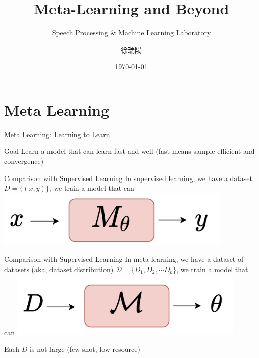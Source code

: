 \documentclass{beamer}
\title{Meta-Learning and Beyond}
\subtitle{\textcolor[rgb]{0.00,0.50,1.00}{{Speech Processing \& Machine Learning Laboratory}}}
\author{徐瑞陽}
\date{\today}
\begin{document}
\begin{frame}
\maketitle
\end{frame}

\section{Meta Learning}

\begin{frame}[t]{Meta Learning: Learning to Learn}
  \begin{block}{Goal}
    Learn a model that can learn fast and well (fast means sample-efficient and convergence)
  \end{block}
\end{frame}

\begin{frame}[t]{Comparison with Supervised Learning}
  In supervised learning, we have a dataset $D = \lbrace (x,y) \rbrace$, we train a model that can 
  \center \includegraphics[width=0.85\textwidth]{fig/sup_learning.png}
\end{frame}

\begin{frame}[t]{Comparison with Supervised Learning}
  In meta learning, we have a dataset of datasets (aka, dataset distribution) $\mathcal{D} = \lbrace D_1, D_2, \cdots D_k \rbrace$, we train a model that can
  \center \includegraphics[width=0.85\textwidth]{fig/meta_learning.png}

  Each $D$ is not large (few-shot, low-resource)
\end{frame}
\end{document}
